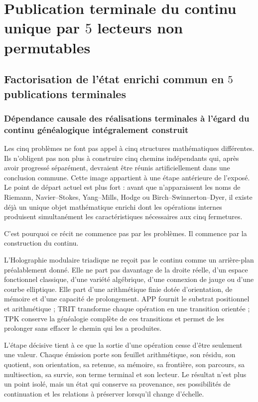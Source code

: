 \section{Publication terminale du continu unique par \(5\) lecteurs non permutables}
\subsection{Factorisation de l’état enrichi commun en \(5\) publications terminales}
\subsubsection{Dépendance causale des réalisations terminales à l’égard du continu généalogique intégralement construit}
Les cinq problèmes ne font pas appel à cinq structures mathématiques différentes. Ils n’obligent pas non plus à construire cinq chemins indépendants qui, après avoir progressé séparément, devraient être réunis artificiellement dans une conclusion commune. Cette image appartient à une étape antérieure de l’exposé. Le point de départ actuel est plus fort : avant que n’apparaissent les noms de Riemann, Navier–Stokes, Yang–Mills, Hodge ou Birch–Swinnerton–Dyer, il existe déjà un unique objet mathématique enrichi dont les opérations internes produisent simultanément les caractéristiques nécessaires aux cinq fermetures.\par
C’est pourquoi ce récit ne commence pas par les problèmes. Il commence par la construction du continu.\par
L’Holographie modulaire triadique ne reçoit pas le continu comme un arrière-plan préalablement donné. Elle ne part pas davantage de la droite réelle, d’un espace fonctionnel classique, d’une variété algébrique, d’une connexion de jauge ou d’une courbe elliptique. Elle part d’une arithmétique finie dotée d’orientation, de mémoire et d’une capacité de prolongement. APP fournit le substrat positionnel et arithmétique ; TRIT transforme chaque opération en une transition orientée ; TPK conserve la généalogie complète de ces transitions et permet de les prolonger sans effacer le chemin qui les a produites.\par
L’étape décisive tient à ce que la sortie d’une opération cesse d’être seulement une valeur. Chaque émission porte son feuillet arithmétique, son résidu, son quotient, son orientation, sa retenue, sa mémoire, sa frontière, son parcours, sa multisection, sa survie, son terme terminal et son lecteur. Le résultat n’est plus un point isolé, mais un état qui conserve sa provenance, ses possibilités de continuation et les relations à préserver lorsqu’il change d’échelle.\par
